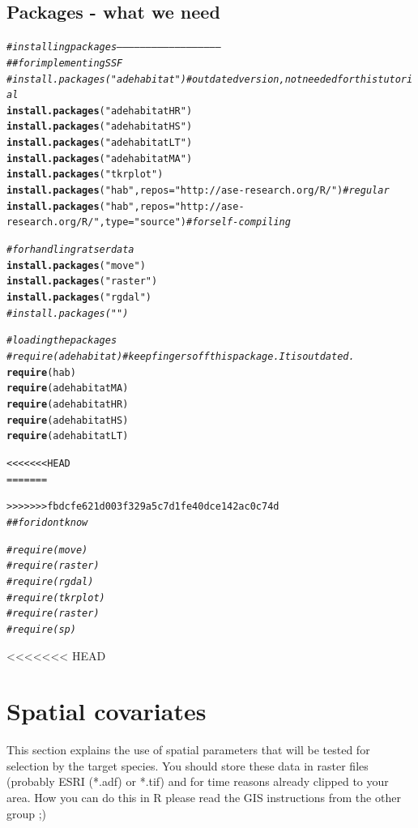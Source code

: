 \documentclass[11pt, a4paper]{article}\usepackage[]{graphicx}\usepackage[]{color}
\makeatletter
\newcommand{\hlstr}[1]{\textcolor[rgb]{0.192,0.494,0.8}{#1}}%
\newcommand{\hlcom}[1]{\textcolor[rgb]{0.678,0.584,0.686}{\textit{#1}}}%
\newcommand{\hlstd}[1]{\textcolor[rgb]{0.345,0.345,0.345}{#1}}%
\newcommand{\hlkwc}[1]{\textcolor[rgb]{0.333,0.667,0.333}{#1}}%
\newcommand{\hlkwd}[1]{\textcolor[rgb]{0.737,0.353,0.396}{\textbf{#1}}}%
\newenvironment{kframe}{%
 \def\at@end@of@kframe{}%
 \ifinner\ifhmode%
  \def\at@end@of@kframe{\end{minipage}}%
  \begin{minipage}{\columnwidth}%
 \fi\fi%
 \def\FrameCommand##1{\hskip\@totalleftmargin \hskip-\fboxsep
 \colorbox{shadecolor}{##1}\hskip-\fboxsep
     \hskip-\linewidth \hskip-\@totalleftmargin \hskip\columnwidth}%
 \MakeFramed {\advance\hsize-\width
   \@totalleftmargin\z@ \linewidth\hsize
   \@setminipage}}%
 {\par\unskip\endMakeFramed%
 \at@end@of@kframe}
\newenvironment{knitrout}{}{} %
\makeatother
\begin{document}
\subsection{Packages - what we need}

\begin{knitrout}
\color{fgcolor}\begin{kframe}
\begin{alltt}
\hlcom{# installing packages -----------------------------------------------------}
\hlcom{## for implementing SSF}
\hlcom{# install.packages("adehabitat") # outdated version, not needed for this tutorial}
\hlkwd{install.packages}\hlstd{(}\hlstr{"adehabitatHR"}\hlstd{)}
\hlkwd{install.packages}\hlstd{(}\hlstr{"adehabitatHS"}\hlstd{)}
\hlkwd{install.packages}\hlstd{(}\hlstr{"adehabitatLT"}\hlstd{)}
\hlkwd{install.packages}\hlstd{(}\hlstr{"adehabitatMA"}\hlstd{)}
\hlkwd{install.packages}\hlstd{(}\hlstr{"tkrplot"}\hlstd{)}
\hlkwd{install.packages}\hlstd{(}\hlstr{"hab"}\hlstd{,} \hlkwc{repos} \hlstd{=} \hlstr{"http://ase-research.org/R/"}\hlstd{)} \hlcom{# regular}
\hlkwd{install.packages}\hlstd{(}\hlstr{"hab"}\hlstd{,} \hlkwc{repos} \hlstd{=} \hlstr{"http://ase-research.org/R/"}\hlstd{,} \hlkwc{type} \hlstd{=} \hlstr{"source"}\hlstd{)} \hlcom{# for self-compiling}

\hlcom{# for handling ratser data}
\hlkwd{install.packages}\hlstd{(}\hlstr{"move"}\hlstd{)}
\hlkwd{install.packages}\hlstd{(}\hlstr{"raster"}\hlstd{)}
\hlkwd{install.packages}\hlstd{(}\hlstr{"rgdal"}\hlstd{)}
\hlcom{#install.packages("")}

\hlcom{# loading the packages}
\hlcom{# require(adehabitat) # keep fingers off this package. It is outdated.}
\hlkwd{require}\hlstd{(hab)}
\hlkwd{require}\hlstd{(adehabitatMA)}
\hlkwd{require}\hlstd{(adehabitatHR)}
\hlkwd{require}\hlstd{(adehabitatHS)}
\hlkwd{require}\hlstd{(adehabitatLT)}

<<<<<<< HEAD
=======

>>>>>>> fbdcfe621d003f329a5c7d1fe40dce142ac0c74d
\hlcom{## for i dont know}

\hlcom{#require(move)}
\hlcom{#require(raster)}
\hlcom{#require(rgdal)}
\hlcom{#require(tkrplot)}
\hlcom{#require(raster)}
\hlcom{#require(sp)}
\end{alltt}
\end{kframe}
\end{knitrout}
<<<<<<< HEAD

\section{Spatial covariates}%
This section explains the use of spatial parameters that will be tested for selection by the target species. You should store these data in raster files (probably ESRI (*.adf) or *.tif) and for time reasons already clipped to your area. How you can do this in R please read the GIS instructions from the other group ;)   
\end{document}
